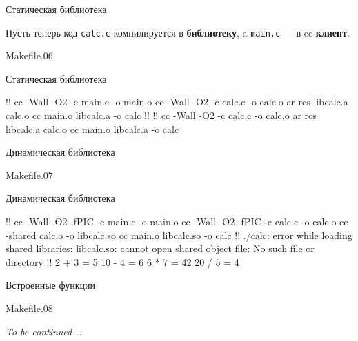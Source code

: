 \documentclass[compress, 8pt, aspectratio=169]{beamer}
\begin{document}
\begin{frame}{Статическая библиотека}

  Пусть теперь код \texttt{calc.c} компилируется в
  \textbf{библиотеку}, a \texttt{main.c} --- в ee \textbf{клиент}.

  \bigbreak

    {Makefile.06}

\end{frame}

\begin{frame}[fragile]{Статическая библиотека}

  \begin{terminalwindow}
!!
cc -Wall -O2 -c main.c -o main.o
cc -Wall -O2 -c calc.c -o calc.o
ar rcs libcalc.a calc.o
cc main.o libcalc.a -o calc
!!
!!
cc -Wall -O2 -c calc.c -o calc.o
ar rcs libcalc.a calc.o
cc main.o libcalc.a -o calc
  \end{terminalwindow}

\end{frame}

\begin{frame}[fragile]{Динамическая библиотека}

    {Makefile.07}

\end{frame}

\begin{frame}[fragile]{Динамическая библиотека}

  \begin{terminalwindow}
!!
cc -Wall -O2 -fPIC -c main.c -o main.o
cc -Wall -O2 -fPIC -c calc.c -o calc.o
cc -shared calc.o -o libcalc.so
cc main.o libcalc.so -o calc
!!
./calc: error while loading shared libraries:
    libcalc.so: cannot open shared object file: No such file or directory
!!
2 + 3 = 5
10 - 4 = 6
6 * 7 = 42
20 / 5 = 4
  \end{terminalwindow}

\end{frame}

\begin{frame}[fragile]{Встроенные функции}

    {Makefile.08}

  \textit{To be continued \dots}

\end{frame}
\end{document}
